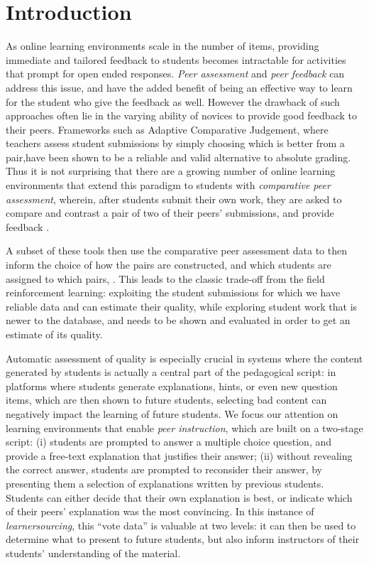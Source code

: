 \documentclass[runningheads]{llncs}
\begin{document}
\section{Introduction}
As online learning environments scale in the number of items, providing 
immediate and tailored feedback to students becomes intractable for activities 
that prompt for open ended responses. \textit{Peer assessment} and \textit{peer 
feedback} can address this issue, and have the added benefit of being an 
effective way to learn for the student who give the feedback as 
well\cite{jhangiani_impact_2016}. 
However the drawback of such approaches often lie in the varying ability of 
novices to provide good feedback to their peers.
Frameworks such as Adaptive Comparative Judgement\cite{pollitt_method_2012}, 
where teachers assess student submissions by simply choosing which is better 
from a pair,have been shown to be a reliable and valid alternative to absolute 
grading.
Thus it is not surprising that there are a growing number of online learning 
environments that extend this paradigm to students with \textit{comparative 
peer assessment}, wherein, after students submit their own work, they are asked 
to compare and contrast a pair of two of their peers' submissions, and provide 
feedback
\cite{univeristy_of_british_columbia_ubc/ubcpi_2019}
\cite{cambre_juxtapeer:_2018}
\cite{potter_compair:_2017}.

A subset of these tools then use the comparative peer assessment data to then 
inform the choice of how the pairs are constructed, and which students are 
assigned to which pairs,
\cite{khosravi_ripple_2019}
\cite{williams_axis:_2016}
\cite{saltise_saltises4/dalite-ng_2019}.
This leads to the classic trade-off from the field reinforcement learning: 
exploiting the student submissions for which we have reliable data and can 
estimate their quality, while exploring student work that is newer to the 
database, and needs to be shown and evaluated in order to get an estimate of 
its quality.

Automatic assessment of quality is especially crucial in systems where the 
content generated by students is actually a central part of the pedagogical 
script: in platforms where students generate explanations, hints, or even new 
question items, which are then shown to future students, selecting bad content 
can negatively impact the learning of future students. 
We focus our attention on learning environments that enable \textit{peer 
instruction}\cite{crouch_peer_2001}, which are built on a two-stage script: (i) 
students are prompted to answer a multiple choice question, and provide a 
free-text explanation that justifies their answer; (ii) without revealing the 
correct answer, students are prompted to reconsider their answer, by presenting 
them a selection of explanations written by previous 
students\cite{charles-woods_designing_nodate}.
Students can either decide that their own explanation is best, or indicate 
which of their peers' explanation was the most convincing.
In this instance of 
\textit{learnersourcing}\cite{weir_learnersourcing_2015}, this ``vote data'' 
is valuable at two levels: it can then be used to determine what to present to 
future students, but also inform instructors of their students' understanding 
of the material.
\end{document}
